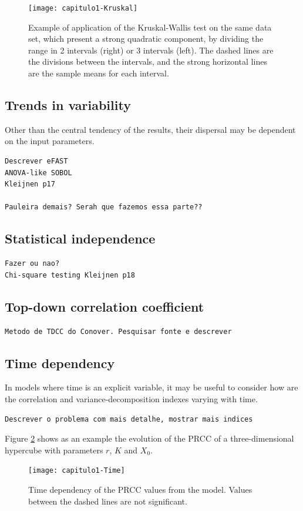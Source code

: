\begin{figure}[htbp]
	\begin{center}
\texttt{[image: capitulo1-Kruskal]}
	\end{center}
	\caption{Example of application of the Kruskal-Wallis test on the
	same data set, which present a strong quadratic component, by
	dividing the range in 2 intervals (right) or 3 intervals (left).
	The dashed lines are the divisions between the intervals, and
	the strong horizontal lines are the sample means for each 
	interval.}
	\label{fig:Kruskal}
\end{figure}

\subsection{Trends in variability}
Other than the central tendency of the results, their dispersal may be 
dependent on the input parameters. 
\begin{verbatim}
Descrever eFAST
ANOVA-like SOBOL
Kleijnen p17

Pauleira demais? Serah que fazemos essa parte??
\end{verbatim}
\subsection{Statistical independence}
\begin{verbatim}
Fazer ou nao?
Chi-square testing Kleijnen p18
\end{verbatim}
\subsection{Top-down correlation coefficient}\label{TDCC}
\begin{verbatim}
Metodo de TDCC do Conover. Pesquisar fonte e descrever
\end{verbatim}
\subsection{Time dependency}
In models where time is an explicit variable, it may be useful to consider
how are the correlation and variance-decomposition indexes varying with time.
\begin{verbatim}
Descrever o problema com mais detalhe, mostrar mais indices
\end{verbatim}
Figure \ref{fig:Time} shows as an example the evolution of the PRCC of a 
three-dimensional hypercube with parameters $r$, $K$ and $X_0$.
\begin{figure}[htbp]
	\begin{center}
\texttt{[image: capitulo1-Time]}
	\end{center}
	\caption{Time dependency of the PRCC values from the model. Values 
	between the dashed lines are not significant.}
	\label{fig:Time}
\end{figure}

